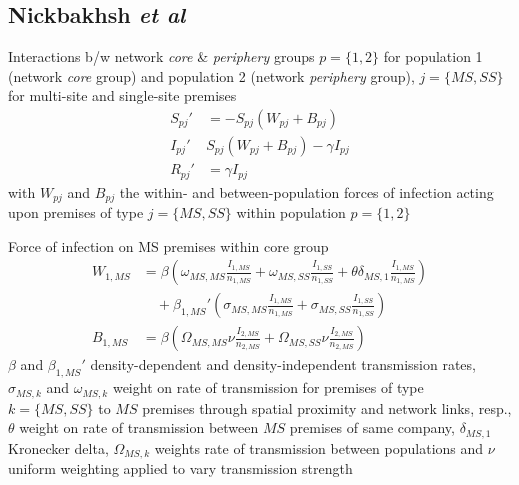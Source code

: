 \documentclass[aspectratio=43]{beamer}
\begin{document}
\subsection{Nickbakhsh \emph{et al}}

\begin{frame}{Interactions b/w network \emph{core} \& \emph{periphery} groups}
	$p=\{1,2\}$ for population 1 (network \emph{core} group) and population 2 (network \emph{periphery} group), $j=\{MS,SS\}$ for multi-site and single-site premises
	\begin{align*}
		S_{pj}' &= -S_{pj}(W_{pj}+B_{pj}) \\
		I_{pj}' & S_{pj}(W_{pj}+B_{pj})-\gamma I_{pj} \\
		R_{pj}' &= \gamma I_{pj}
	\end{align*}
	with $W_{pj}$ and $B_{pj}$ the within- and between-population forces of infection acting upon premises of type $j=\{MS,SS\}$ within population $p=\{1,2\}$
\end{frame}


\begin{frame}{Force of infection on MS premises within core group}
	\begin{align*}
		W_{1,MS} &= \beta\left(
			\omega_{MS,MS}\frac{I_{1,MS}}{n_{1,MS}}+
			\omega_{MS,SS}\frac{I_{1,SS}}{n_{1,SS}}
			+\theta\delta_{MS,1}\frac{I_{1,MS}}{n_{1,MS}}
		\right) \\
		&\quad 
		+\beta_{1,MS}'\left(
			\sigma_{MS,MS}\frac{I_{1,MS}}{n_{1,MS}}+
			\sigma_{MS,SS}\frac{I_{1,SS}}{n_{1,SS}}
		\right) \\
		B_{1,MS} &= \beta\left(\Omega_{MS,MS}\nu\frac{I_{2,MS}}{n_{2,MS}}
		+\Omega_{MS,SS}\nu\frac{I_{2,MS}}{n_{2,MS}}\right)
	\end{align*}
	\vfill
	$\beta$ and $\beta_{1,MS}'$ density-dependent and density-independent transmission rates, $\sigma_{MS,k}$ and $\omega_{MS,k}$ weight on rate of transmission for premises of type $k=\{MS,SS\}$ to $MS$ premises through spatial proximity and network links, resp., $\theta$ weight on rate of transmission between $MS$ premises of same company, $\delta_{MS,1}$ Kronecker delta, $\Omega_{MS,k}$ weights rate of transmission between populations and $\nu$ uniform weighting applied to vary transmission strength
\end{frame}
\end{document}
